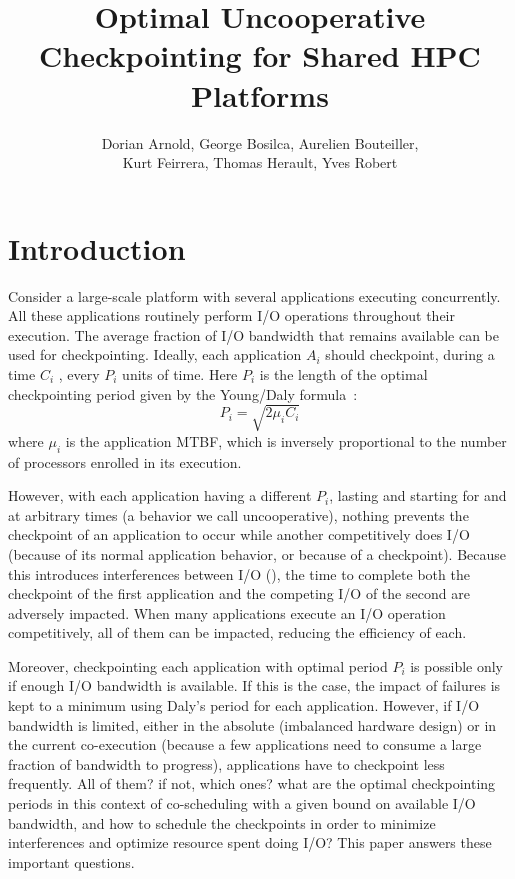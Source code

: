 \documentclass{article}
\author{Dorian Arnold, George Bosilca, Aurelien Bouteiller,\\
 Kurt Feirrera, Thomas Herault, Yves Robert}
\title{Optimal Uncooperative Checkpointing for Shared HPC Platforms}
\begin{document}
\maketitle

\section{Introduction}

Consider a large-scale platform with several applications executing
concurrently. All these applications routinely perform I/O operations
throughout their execution. The average fraction of I/O bandwidth that
remains available can be used for checkpointing. Ideally, each application $A_{i}$
should checkpoint, during a time $C_{i}$ , 
every $P_{i}$ units of time. Here $P_{i}$ is the length of the
optimal checkpointing period given by the Young/Daly formula~\cite{young74,daly04}:
$$P_{i} = \sqrt{2 \mu_{i} C_{i}}$$
where $\mu_{i}$ is the application MTBF, which is inversely
proportional to the number of processors enrolled in its execution.
 
However, with each application having a different $P_{i}$, lasting and
starting for and at arbitrary times (a behavior we call
uncooperative), nothing prevents the checkpoint of an application to
occur while another competitively does I/O (because of its normal
application behavior, or because of a checkpoint). Because this
introduces interferences between I/O (\cite{interference}), the time
to complete both the checkpoint of the first application and the
competing I/O of the second are adversely impacted. When many
applications execute an I/O operation competitively, all of them can
be impacted, reducing the efficiency of each.

Moreover, checkpointing each application with optimal period $P_{i}$
is possible only if enough I/O bandwidth is available. If this is the
case, the impact of failures is kept to a minimum using Daly's period
for each application.  However, if I/O bandwidth is limited, either in
the absolute (imbalanced hardware design) or in the current
co-execution (because a few applications need to consume a large
fraction of bandwidth to progress), applications have to checkpoint
less frequently.  All of them? if not, which ones? what are the
optimal checkpointing periods in this context of co-scheduling with a
given bound on available I/O bandwidth, and how to schedule the
checkpoints in order to minimize interferences and optimize resource
spent doing I/O? This paper answers these important questions.
\end{document}
